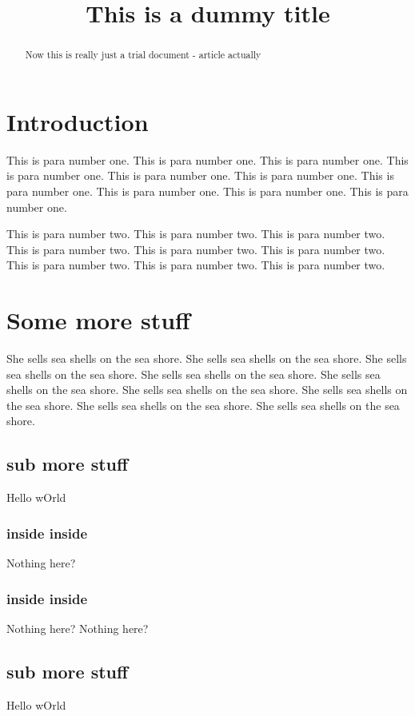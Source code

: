 \documentclass [a4paper,12pt,threecolumn] {article}
\begin{document}
\title{This is a dummy title}
\maketitle

\begin{abstract}
Now this is really just a trial document - article actually
\end{abstract}


\section{Introduction}

This is para number one.
This is para number one.
This is para number one.
This is para number one.
This is para number one.
This is para number one.
This is para number one.
This is para number one.
This is para number one.
This is para number one.


This is para number two.
This is para number two.
This is para number two.
This is para number two.
This is para number two.
This is para number two.
This is para number two.
This is para number two.
This is para number two.

\section{Some more stuff}
She sells sea shells on the sea shore.
She sells sea shells on the sea shore.
She sells sea shells on the sea shore.
She sells sea shells on the sea shore.
She sells sea shells on the sea shore.
She sells sea shells on the sea shore.
She sells sea shells on the sea shore.
She sells sea shells on the sea shore.
She sells sea shells on the sea shore.

\subsection{sub more stuff}
Hello wOrld
\subsubsection{inside inside}

Nothing here?
\subsubsection{inside inside}

Nothing here?
Nothing here?

\subsection{sub more stuff}
Hello wOrld
\end{document}
